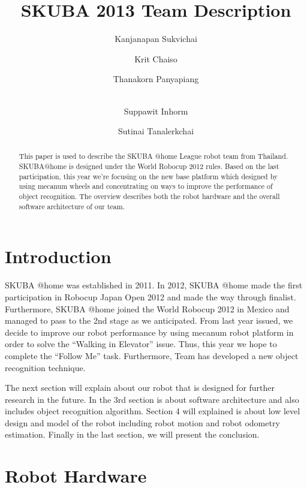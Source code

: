 \documentclass{llncs}
\newcommand{\dq}[1]{``#1''}
\begin{document}
\title{SKUBA 2013 Team Description}
\author{Kanjanapan Sukvichai
\and Krit Chaiso
\and Thanakorn Panyapiang
\and \\ Suppawit Inhorm
\and Sutinai Tanalerkchai
}


\maketitle

\begin{abstract}
This paper is used to describe the SKUBA @home League robot team from Thailand.
SKUBA@home is designed under the World Robocup 2012 rules. 
Based on the last participation, this year we're focusing on the new base platform which designed by using mecanum wheels and concentrating on ways to improve the performance of object recognition.
The overview describes both the robot hardware and the overall software architecture of our team.
\end{abstract}

\section{Introduction}
SKUBA @home was established in 2011. In 2012, SKUBA @home made the first participation in Robocup Japan Open 2012 and made the way through finalist. Furthermore, SKUBA @home joined the World Robocup 2012 in Mexico and managed to pass to the 2nd stage as we anticipated. From last year issued, we decide to improve our robot performance by using mecanum robot platform in order to solve the \dq{Walking in Elevator} issue. Thus, this year we hope to complete the \dq{Follow Me} task. Furthermore, Team has developed a new object recognition technique.

The next section will explain about our robot that is designed for further research in the future. In the 3rd section is about software architecture and also includes object recognition algorithm. Section 4 will explained is about low level design and model of the robot including robot motion and robot odometry estimation. Finally in the last section, we will present the conclusion.

\section{Robot Hardware}
\end{document}
